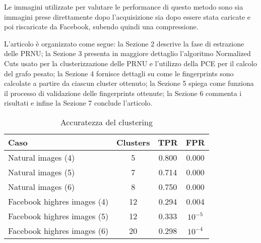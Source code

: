 Le immagini utilizzate per valutare le performance di questo metodo sono sia immagini prese direttamente dopo l'acquisizione sia dopo essere stata caricate e poi riscaricate da Facebook, subendo quindi una compressione.

L'articolo è organizzato come segue: la Sezione 2 descrive la fase di estrazione delle PRNU; la Sezione 3 presenta in maggiore dettaglio l'algoritmo Normalized Cuts usato per la clusterizzazione delle PRNU e l'utilizzo della PCE per il calcolo del grafo pesato; la Sezione 4 fornisce dettagli su come le fingerprints sono calcolate a partire da ciascun cluster ottenuto; la Sezione 5 spiega come funziona il processo di validazione delle fingerprints ottenute; la Sezione 6 commenta i risultati e infine la Sezione 7 conclude l'articolo.


\begin{table}[ht]
\caption{Accuratezza del clustering}
\centering %
\begin{tabular}{l c c c} %
\hline\hline %
Caso & Clusters & TPR & FPR \\ [0.5ex] %
\hline %
Natural images (4) & 5 & 0.800 & 0.000 \\ %
Natural images (5) & 7 & 0.714 & 0.000 \\
Natural images (6) & 8 & 0.750 & 0.000 \\
Facebook highres images (4) & 12 & 0.294 & 0.004 \\
Facebook highres images (5) & 12 & 0.333 & $10^{-5}$ \\
Facebook highres images (6) & 20 & 0.298 & $10^{-4}$ \\ [1ex] %
\hline %
\end{tabular}
\label{table:nonlin} %
\end{table}